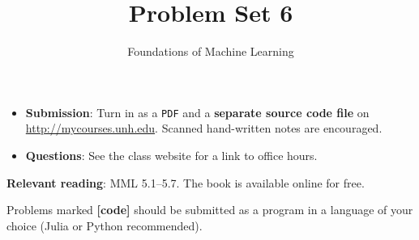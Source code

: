 \documentclass[letterpaper]{article}
\title{Problem Set 6}
\author{Foundations of Machine Learning}
\date{}
\begin{document}
\maketitle

\begin{itemize}
\item \textbf{Submission}: Turn in as a \texttt{PDF} and a \textbf{separate source code file} on \url{http://mycourses.unh.edu}. Scanned hand-written notes are encouraged.
\item \textbf{Questions}: See the class website for a link to office hours.
\end{itemize}

\textbf{Relevant reading}: MML 5.1--5.7. The book is available online for free. 

Problems marked \textbf{[code]} should be submitted as a program in a language of your choice (Julia or Python recommended). 
\end{document}

